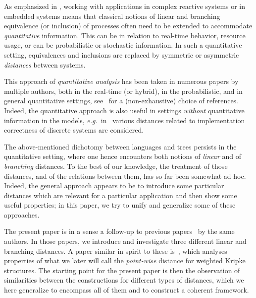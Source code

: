 \documentclass[copyright,creativecommons,sharealike]{eptcs}
\theoremstyle{plain}
\newcommand*\eg{\textit{e.g.}}
\begin{document}
As emphasized in \cite{DBLP:conf/fm/HenzingerS06}, working with applications in
complex reactive systems or in embedded systems means that classical
notions of linear and branching equivalence (or inclusion) of
processes often need to be extended to accommodate \emph{quantitative}
information. This can be in relation to real-time behavior, resource
usage, or can be probabilistic or stochastic information.
In such a quantitative setting, equivalences and inclusions are
replaced by symmetric or asymmetric \emph{distances} between systems.

This approach of \emph{quantitative analysis} has been taken in
numerous papers by multiple authors, both in the real-time (or
hybrid), in the probabilistic, and in general quantitative settings,
see~\cite{DBLP:conf/qest/DesharnaisLT08,conf/concur/CernyHR10,conf/csl/ChatterjeeDH08,conf/icalp/AlfaroFS04,conf/icalp/AlfaroHM03,journals/tcs/DesharnaisGJP04,FahrenbergLT10,Giacalone90,conf/formats/2005/HenzM05,journals/jlap/ThraneFL10,DBLP:conf/stoc/Kozen83,axiomat}
for a (non-exhaustive) choice of references.  Indeed, the quantitative
approach is also useful in settings \emph{without} quantitative
information in the models, \eg~in~\cite{conf/concur/CernyHR10} various
distances related to implementation correctness of discrete systems
are considered.

The above-mentioned dichotomy between languages and trees persists in
the quantitative setting, where one hence encounters both notions of
\emph{linear} and of \emph{branching} distances.  To the best of our
knowledge, the treatment of those distances, and of the relations
between them, has so far been somewhat ad hoc.  Indeed, the general
approach appears to be to introduce some particular distances which
are relevant for a particular application and then show some useful
properties; in this paper, we try to unify and generalize some of
these approaches.

The present paper is in a sense a follow-up to previous
papers~\cite{FahrenbergLT10,journals/jlap/ThraneFL10} by the same
authors.  In those papers, we introduce and investigate three
different linear and branching distances.  A paper similar in spirit
to these is~\cite{conf/icalp/AlfaroFS04}, which analyses properties of
what we later will call the \emph{point-wise} distance for weighted
Kripke structures.  The starting point for the present paper is then
the observation of similarities between the constructions for
different types of distances, which we here generalize to encompass
all of them and to construct a coherent framework.
\end{document}
